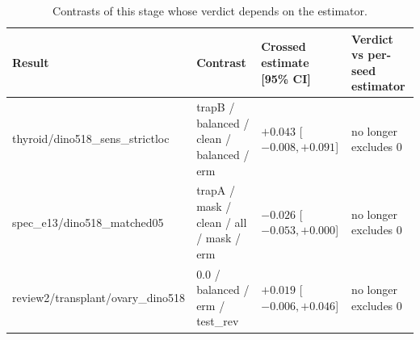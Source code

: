 \begin{table}[H]\centering\scriptsize
\caption{Contrasts of this stage whose verdict depends on the estimator.}\label{tab:estchanges}
\begin{tabular}{p{4.2cm}p{5.2cm}p{3.3cm}p{2.6cm}}\toprule
Result & Contrast & Crossed estimate [95\% CI] & Verdict vs per-seed estimator \\\midrule
thyroid/\allowbreak{}dino518\_sens\_strictloc & trapB /\allowbreak{} balanced /\allowbreak{} clean /\allowbreak{} balanced /\allowbreak{} erm & $+0.043$ [$-0.008, +0.091$] & no longer excludes 0 \\
spec\_e13/\allowbreak{}dino518\_matched05 & trapA /\allowbreak{} mask /\allowbreak{} clean /\allowbreak{} all /\allowbreak{} mask /\allowbreak{} erm & $-0.026$ [$-0.053, +0.000$] & no longer excludes 0 \\
review2/\allowbreak{}transplant/\allowbreak{}ovary\_dino518 & 0.0 /\allowbreak{} balanced /\allowbreak{} erm /\allowbreak{} test\_rev & $+0.019$ [$-0.006, +0.046$] & no longer excludes 0 \\
\bottomrule\end{tabular}
\end{table}
